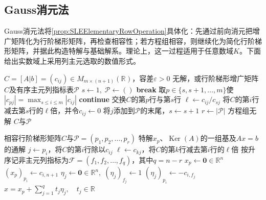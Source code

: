 \subsection{Gauss消元法}

Gauss消元法将\cref{prop:SLEElementaryRowOperation}具体化：先通过前向消元把增广矩阵化为行阶梯形矩阵，再检查相容性；若方程组相容，则继续化为简化行阶梯形矩阵，并据此构造特解与基础解系。理论上，这一过程适用于任意数域$K$。下面给出实数域上采用列主元选取的数值形式。

\begin{algorithm}[H]
	\caption{Gauss前向消元与相容性检查}
	\label{alg:gauss}
	\begin{algorithmic}[1]
		\Require $C=[A|b]=(c_{ij})\in M_{m\times(n+1)}(\mathbb{R}^{})$，容差$\varepsilon>0$
		\Ensure 无解，或行阶梯形增广矩阵$C$及有序主元列指标表$\mathcal{P}$
		\State $s\gets1,\;\mathcal{P}\gets()$ 
				\State \textbf{break}
			\EndIf
			\State 取$p\in\{s,s+1,\dots,m\}$使$|c_{pj}|=\max_{s\leqslant i\leqslant m}|c_{ij}|$
				\State \textbf{continue} 
			\EndIf
			\State 交换$C$的第$p$行与第$s$行
				\State $\ell\gets c_{ij}/c_{sj}$
				\State 将$C$的第$i$行减去第$s$行的$\ell$倍，并令$c_{ij}\gets0$
			\EndFor
			\State 将$j$添加到$\mathcal{P}$的末尾，$s\gets s+1$
		\EndFor
		\State $r\gets|\mathcal{P}|$
				\State \Return 方程组无解
			\EndIf
		\EndFor
		\State \Return $C$与$\mathcal{P}$
	\end{algorithmic}
\end{algorithm}

\begin{algorithm}[H]
	\caption{Gauss--Jordan回代与通解构造}
	\label{alg:gaussGeneralSolution}
	\begin{algorithmic}[1]
		\Require 相容行阶梯形矩阵$C$与$\mathcal{P}=(p_1,p_2,\dots,p_r)$
		\Ensure 特解$x_p$、$\operatorname{Ker}(A)$的一组基及$Ax=b$的通解
			\State $j\gets p_i$，将$C$的第$i$行除以$c_{ij}$
				\State $\ell\gets c_{kj}$，将$C$的第$k$行减去第$i$行的$\ell$倍
			\EndFor
		\EndFor
		\State 按升序记非主元列指标为$\mathcal{F}=(f_1,f_2,\dots,f_q)$，其中$q=n-r$
		\State $x_p\gets\mathbf{0}\in\mathbb{R}^n$
			\State $(x_p)_{p_i}\gets c_{i,n+1}$
		\EndFor
			\State $\eta_j\gets\mathbf{0}\in\mathbb{R}^n,\;(\eta_j)_{f_j}\gets1$
				\State $(\eta_j)_{p_i}\gets-c_{i,f_j}$
			\EndFor
		\EndFor
		\State \Return $x=x_p+\sum_{j=1}^{q}t_j\eta_j,\quad t_j\in\mathbb{R}^{}$
	\end{algorithmic}
\end{algorithm}
